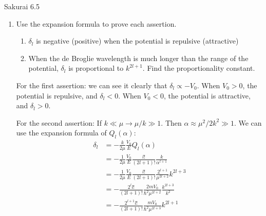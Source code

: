 \documentclass{article}
\begin{document}
\begin{section}{Sakurai 6.5}
\begin{enumerate}
	\newpage
	\item Use the expansion formula to prove each assertion.
	\begin{enumerate}
		\item $\delta_l$ is negative (positive) when the potential is repulsive (attractive)
		\item When the de Broglie wavelength is much longer than the range of the potential, $\delta_l$ is proportional to $k^{2l+1}$. Find the proportionality constant.
	\end{enumerate}
	\begin{tcolorbox}[breakable]
		For the first assertion: we can see it clearly that $\delta_l \propto -V_0$. When $V_0 > 0$, the potential is repulsive, and $\delta_l < 0$. When $V_0 < 0$, the potential is attractive, and $\delta_l > 0$.

		For the second assertion: If $k \ll \mu \to \mu/k \gg 1$. Then $\alpha \approx \mu^2/2k^2 \gg 1$. We can use the expansion formula of $Q_l(\alpha)$:
		\begin{align*}
			\delta_l & = -\frac{k}{2\mu} \frac{V_0}{E} Q_l(\alpha)                                            \\
			         & = -\frac{1}{2\mu} \frac{V_0}{E} \frac{l!}{(2l+1)!}\frac{k}{\alpha^{l+1}}               \\
			         & = -\frac{1}{2\mu} \frac{V_0}{E} \frac{l!}{(2l+1)!} \frac{2^{l+1}}{\mu^{2l+2}} k^{2l+3} \\
			         & = -\frac{2^l l!}{(2l+1)!} \frac{2mV_0}{\hbar^2 \mu^{2l+2}} \frac{k^{2l+3}}{k^2}        \\
			         & = -\frac{2^{l+1} l!}{(2l+1)!} \frac{m V_0}{\hbar^2 \mu^{2l+3}} k^{2l+1}                \\
		\end{align*}
	\end{tcolorbox}
\end{enumerate}
\end{section}
\end{document}
